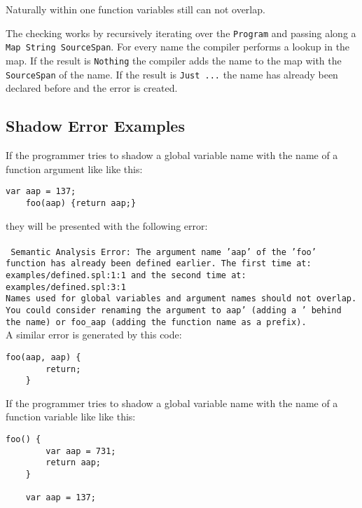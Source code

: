 \documentclass{report}
\begin{document}
Naturally within one function variables still can not overlap. 

The checking works by recursively iterating over the \texttt{Program} and passing along a \texttt{Map String SourceSpan}. For every name the compiler performs a lookup in the map. If the result is \texttt{Nothing} the compiler adds the name to the map with the \texttt{SourceSpan} of the name. If the result is \texttt{Just ...} the name has already been declared before and the error is created. 

\subsection{Shadow Error Examples}

If the programmer tries to shadow a global variable name with the name of a function argument like like this:

\begin{lstlisting}[style=SPL]
    var aap = 137;
    foo(aap) {return aap;}
\end{lstlisting}

they will be presented with the following error:\\\\
\noindent\texttt{
\textcolor{error}{Semantic Analysis Error: The argument name '\textcolor{name}{aap}' of the '\textcolor{name}{foo}' function has already been defined earlier.}
The first time at: \textcolor{filename}{examples/defined.spl:1:1} and the second time at: \textcolor{filename}{examples/defined.spl:3:1}\\
Names used for global variables and argument names should not overlap. 
You could consider renaming the argument to \textcolor{name}{aap'} (adding a ' behind the name) or \textcolor{name}{foo\_aap} (adding the function name as a prefix).}
\\

A similar error is generated by this code:

\begin{lstlisting}[style=SPL]
    foo(aap, aap) {
        return;
    }
\end{lstlisting}

If the programmer tries to shadow a global variable name with the name of a function variable like like this:

\begin{lstlisting}[style=SPL]
    foo() {
        var aap = 731;
        return aap;
    }
    
    var aap = 137;
\end{lstlisting}
\end{document}
